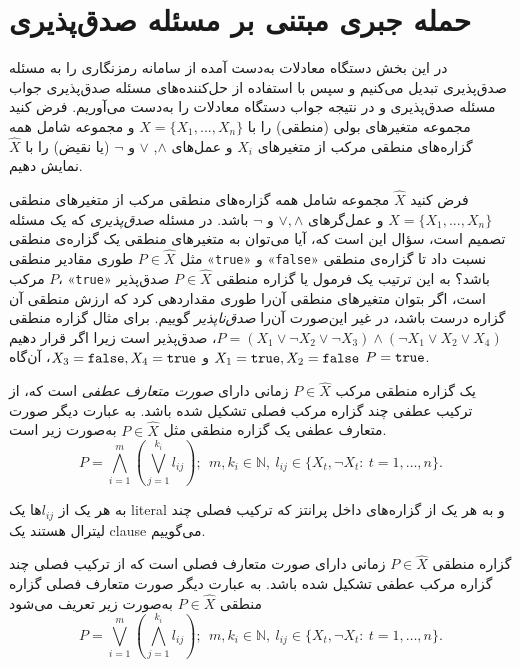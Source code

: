 \section{حمله جبری مبتنی بر مسئله صدق‌پذیری}
در این بخش دستگاه معادلات به‌دست آمده از سامانه رمزنگاری را به مسئله صدق‌پذیری تبدیل می‌کنیم و سپس با استفاده از حل‌کننده‌های مسئله صدق‌پذیری جواب مسئله‌ صدق‌پذیری و در نتیجه جواب دستگاه معادلات را به‌دست می‌آوریم. فرض کنید مجموعه متغیرهای بولی (منطقی) را با 
$X = \{X_{1},...,X_{n}\}$
و مجموعه شامل همه گزاره‌های منطقی مرکب از متغیرهای 
$X_{i}$
و عمل‌های 
$\wedge$, $\vee$
و
$\neg$
(یا نقیض) را با 
$\widehat{X}$
نمایش دهیم. 

\begin{definition}
فرض کنید 
$\widehat{X}$
مجموعه‌  شامل همه گزاره‌های منطقی مرکب از متغیرهای منطقی 
$X = \{X_{1},...,X_{n}\}$
و عمل‌گرهای 
$\vee, \wedge$
و
$\neg$
باشد. در مسئله 
\textit{صدق‌پذیری}
که یک مسئله‌ تصمیم است، سؤال این است که، آیا می‌توان به متغیرهای منطقی یک گزاره‌ی منطقی مثل 
$P\in \widehat{X}$
طوری مقادیر منطقی 
«\verb|true|»
 و 
 «\verb|false|»
  نسبت داد تا  گزاره‌ی منطقی مرکب 
$P$،
 «\verb|true|» 
 باشد؟ به این ترتیب یک فرمول یا گزاره منطقی 
$P\in \widehat{X}$
صدق‌پذیر است، اگر بتوان متغیرهای منطقی آن‌را طوری مقداردهی کرد که  ارزش  منطقی آن‌ گزاره درست باشد،  در غیر این‌صورت آن‌را 
\textit{صدق‌ناپذیر}
گوییم. برای مثال گزاره‌ منطقی 
$P = (X_{1}\vee \neg X_{2}\vee \neg X_{3})\wedge(\neg X_{1}\vee  X_{2}\vee X_{4})$، 
صدق‌پذیر است زیرا اگر قرار دهیم 
$X_{1} = \verb|true|, X_{2} = \verb|false|$
و
$X_{3} = \verb|false|, X_{4} = \verb|true|$، 
آن‌گاه 
$P = \verb|true|$.
\end{definition}
\begin{definition}
یک گزاره منطقی مرکب 
$P\in\widehat{X}$
زمانی دارای 
\textit{صورت متعارف عطفی}
است که،  از ترکیب عطفی  چند گزاره مرکب فصلی تشکیل شده باشد.  به عبارت دیگر صورت متعارف عطفی یک گزاره منطقی مثل 
$P\in\widehat{X}$
به‌صورت زیر است. 
$$P = \bigwedge_{i = 1}^{m}(\bigvee_{j = 1}^{k_{i}} l_{ij}); \  \ m,k_{i}\in \mathbb{N}, \ l_{ij}\in \{X_{t},\neg X_{t}: \  t = 1,\ldots,n \}.$$
\end{definition}
به هر یک از 
$l_{ij}$ها
یک 
\gls*{literal}
و به هر یک از گزاره‌های داخل پرانتز که ترکیب فصلی چند لیترال هستند یک 
\gls*{clause}
 می‌گوییم. 
\begin{definition}
	گزاره منطقی 
$P\in \widehat{X}$
زمانی دارای صورت  متعارف فصلی است که از ترکیب فصلی چند گزاره مرکب عطفی تشکیل شده باشد. به عبارت دیگر  صورت متعارف فصلی  گزاره منطقی 
$P\in \widehat{X}$
 به‌صورت زیر تعریف می‌شود 
$$P = \bigvee_{i = 1}^{m}(\bigwedge_{j = 1}^{k_{i}} l_{ij}); \  \ m,k_{i}\in \mathbb{N}, \ l_{ij}\in \{X_{t},\neg X_{t}: \  t = 1,\ldots,n \}.$$
\end{definition}
